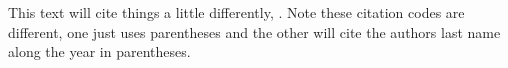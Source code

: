 \documentclass[12pt]{article}
\begin{document}
\begin{flushleft}
This text will cite things a little differently, \cite{cary1967influence}. Note these citation codes are different, one just uses parentheses and the other will cite the authors last name along the year in parentheses. 





\clearpage
\begingroup
	\nocite{*}
	
	
	
	
	
	
	
\endgroup






\end{flushleft}
\end{document}
